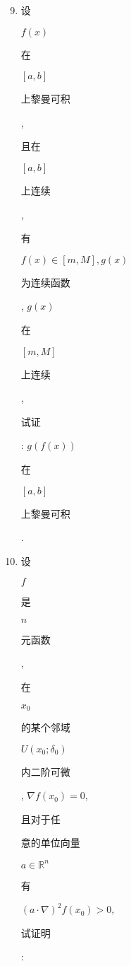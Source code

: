 \documentclass[10pt]{article}
\begin{document}
\begin{enumerate}
  \setcounter{enumi}{8}
  \item \begin{CJK}{UTF8}{mj}设\end{CJK} $f(x)$ \begin{CJK}{UTF8}{mj}在\end{CJK} $[a, b]$ \begin{CJK}{UTF8}{mj}上黎曼可积\end{CJK}, \begin{CJK}{UTF8}{mj}且在\end{CJK} $[a, b]$ \begin{CJK}{UTF8}{mj}上连续\end{CJK}, \begin{CJK}{UTF8}{mj}有\end{CJK} $f(x) \in[m, M], g(x)$ \begin{CJK}{UTF8}{mj}为连续函数\end{CJK}, $g(x)$ \begin{CJK}{UTF8}{mj}在\end{CJK} $[m, M]$ \begin{CJK}{UTF8}{mj}上连续\end{CJK}, \begin{CJK}{UTF8}{mj}试证\end{CJK}: $g(f(x))$ \begin{CJK}{UTF8}{mj}在\end{CJK} $[a, b]$ \begin{CJK}{UTF8}{mj}上黎曼可积\end{CJK}.

  \item \begin{CJK}{UTF8}{mj}设\end{CJK} $f$ \begin{CJK}{UTF8}{mj}是\end{CJK} $n$ \begin{CJK}{UTF8}{mj}元函数\end{CJK}, \begin{CJK}{UTF8}{mj}在\end{CJK} $x_{0}$ \begin{CJK}{UTF8}{mj}的某个邻域\end{CJK} $U\left(x_{0} ; \delta_{0}\right)$ \begin{CJK}{UTF8}{mj}内二阶可微\end{CJK}, $\nabla f\left(x_{0}\right)=0$, \begin{CJK}{UTF8}{mj}且对于任\end{CJK} \begin{CJK}{UTF8}{mj}意的单位向量\end{CJK} $a \in \mathbb{R}^{n}$ \begin{CJK}{UTF8}{mj}有\end{CJK} $(a \cdot \nabla)^{2} f\left(x_{0}\right)>0$, \begin{CJK}{UTF8}{mj}试证明\end{CJK}:

\end{enumerate}
\end{document}
